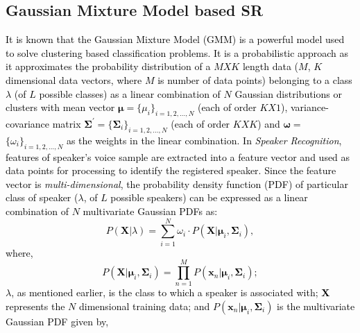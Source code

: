\documentclass{article}
\begin{document}
{\subsection{Gaussian Mixture Model based SR} 
\textcolor{black}{It is known that the Gaussian Mixture Model (GMM) is a 
powerful model used to solve clustering based classification problems.  
It is a probabilistic approach as it approximates the probability distribution of a $M X K$ length data ($M$, $K$ dimensional data vectors, where $M$ is number of data points) belonging to a class $\lambda$ (of $L$ possible classes) as a linear combination of $ N$ Gaussian distributions or clusters %
with mean vector $\bm \mu$$=$$\{\mu_i\}_{i=1,2,\ldots,N}$ (each of order $K$$X$$1$), variance-covariance \textcolor{black}{matrix} %
$\bm \Sigma^\prime$$=$$\{\bm\Sigma_i\}_{i=1,2,\ldots,N}$ (each of order $K$$X$$K$) and $\bm \omega$$=$$\{\omega_i\}_{i=1,2,\ldots,N}$  as the weights in the linear combination.} \textcolor{black}{In 
\textit{Speaker Recognition}, features of speaker's voice sample 
are extracted into a feature vector and used as data points for processing to identify the registered speaker. %
Since the feature vector is \textit{multi-dimensional}, %
the probability density function (PDF) 
of particular class of speaker ($\lambda$, of $L$ possible speakers) can be expressed as a linear combination of $N$ multivariate Gaussian PDFs \cite{4} as:
\begin{equation}
P(\bm X\vert\lambda) = \sum\limits_{i=1}^N \omega_i \cdot P(\bm X|\bm \mu_i,\bm \Sigma_i)
\label{eq1},
\end{equation}
where,
\begin{equation}
P(\bm X|\bm \mu_i,\bm \Sigma_i) = \prod\limits_{n=1}^{M} P(\bm x_n|\bm \mu_i,\bm \Sigma_i);
\end{equation}
\textbf{$\lambda$}, as mentioned earlier, is the class to which a speaker is associated with; $\bm X$ represents the $N$ dimensional training data; and $P(\bm x_n|\bm\mu_i,\bm\Sigma_i)$ is the multivariate Gaussian PDF given by,%
}}
\end{document}
